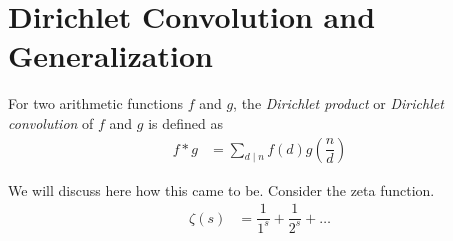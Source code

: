 \documentclass[]{subfile}
\begin{document}
    \section{Dirichlet Convolution and Generalization}
        \begin{definition}
            For two arithmetic functions $f$ and $g$, the \textit{Dirichlet product} or \textit{Dirichlet convolution} of $f$ and $g$ is defined as
                \begin{align*}
                    f\ast g
                        & = \sum_{d\mid n}f(d)g\left(\dfrac{n}{d}\right)
                \end{align*}
        \end{definition}
    We will discuss here how this came to be. Consider the zeta function.
        \begin{align*}
            \zeta(s)
                & = \dfrac{1}{1^{s}}+\dfrac{1}{2^{s}}+\ldots\\
        \end{align*}
\end{document}
